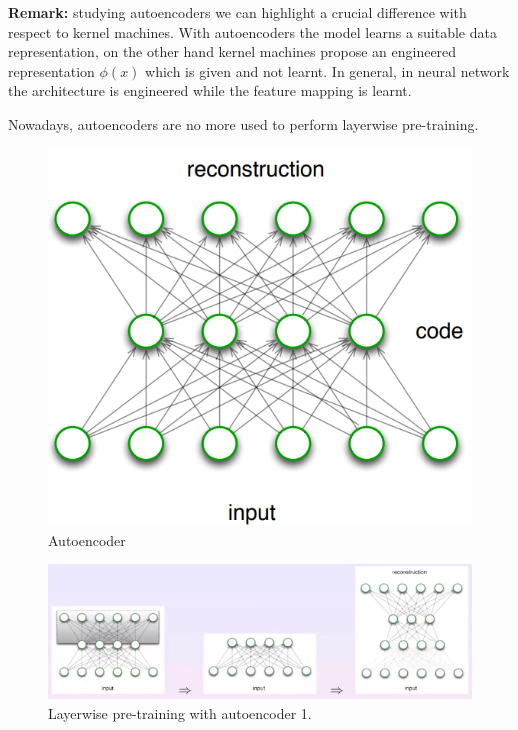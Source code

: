 \textbf{Remark:} studying autoencoders we can highlight a crucial difference with
respect to kernel machines. With autoencoders the model learns a suitable data
representation, on the other hand kernel machines propose an engineered representation
$\phi(x)$ which is given and not learnt. In general, in neural network the architecture
is engineered while the feature mapping is learnt.
\newline

Nowadays, autoencoders are no more used to perform layerwise pre-training.

\begin{figure}[H]
	\centering
	\includegraphics[scale=0.5]{
        images/16_DeepLearning_autoencoder.png
    }
	\caption{Autoencoder}
	\label{fig:autoencoder}
\end{figure}

\begin{figure}[H]
	\centering
	\includegraphics[width=\textwidth]{
		images/16_DeepLearning_autoencoderLayerwise1.png
	}
	\caption{Layerwise pre-training with autoencoder 1.}
	\label{fig:autoencoder_layerwise1}
\end{figure}

